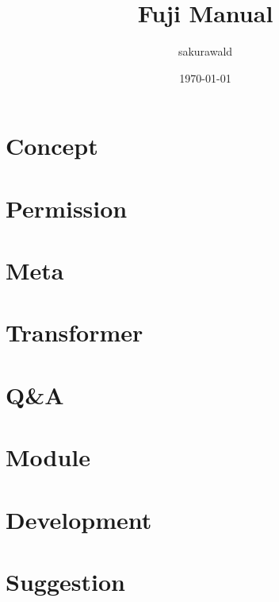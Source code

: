 \documentclass[10pt,oneside]{book}
\begin{document}
    \title{Fuji Manual}
    \author{sakurawald}
    \date{\today\\\version}

    \maketitle
    \tableofcontents


    \mainmatter


    \chapter{Concept}\label{ch:concept}
    


    \chapter{Permission}\label{ch:permission}
    


    \chapter{Meta}\label{ch:meta}
    


    \chapter{Transformer}\label{ch:transformer}
    


    \chapter{Q\&A}\label{ch:q&a}
    


    \chapter{Module}\label{ch:module}
    


    \chapter{Development}\label{ch:development}
    


    \chapter{Suggestion}\label{ch:suggestion}
    
\end{document}
